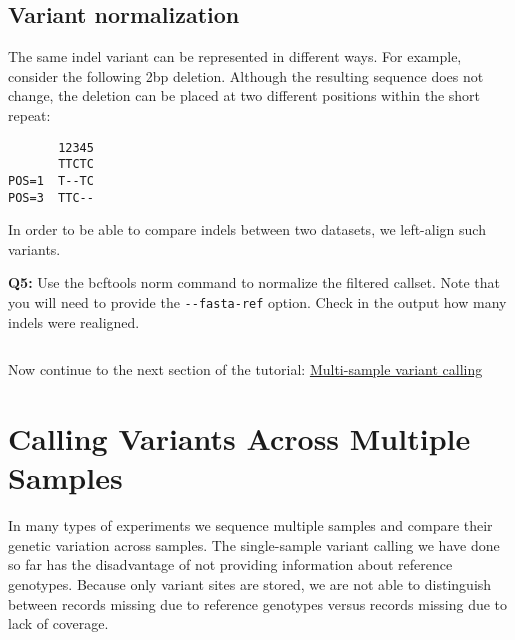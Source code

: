 \documentclass[11pt]{article}
\makeatletter
\newcommand{\boxspacing}{\kern\kvtcb@left@rule\kern\kvtcb@boxsep}
\newcommand{\prompt}[4]{

        {\ttfamily\llap{{\color{blue}\LARGE\faKeyboardO\hspace{3pt}#4}}\vspace{-\baselineskip}}
    }
\makeatother
\begin{document}
    \hypertarget{variant-normalization}{%
\subsection{Variant normalization}\label{variant-normalization}}

The same indel variant can be represented in different ways. For
example, consider the following 2bp deletion. Although the resulting
sequence does not change, the deletion can be placed at two different
positions within the short repeat:

\begin{verbatim}
       12345
       TTCTC
POS=1  T--TC
POS=3  TTC--
\end{verbatim}

In order to be able to compare indels between two datasets, we
left-align such variants.

\textbf{Q5:} Use the bcftools norm command to normalize the filtered
callset. Note that you will need to provide the \texttt{-\/-fasta-ref}
option. Check in the output how many indels were realigned.

    \begin{tcolorbox}[breakable, size=fbox, boxrule=1pt, pad at break*=1mm,colback=cellbackground, colframe=cellborder]
\prompt{In}{incolor}{ }{\boxspacing}
\begin{Verbatim}[commandchars=\\\{\}]

\end{Verbatim}
\end{tcolorbox}

    Now continue to the next section of the tutorial:
\href{multi-sample-calling.ipynb}{Multi-sample variant calling}





\newpage





    \hypertarget{calling-variants-across-multiple-samples}{%
\section{Calling Variants Across Multiple
Samples}\label{calling-variants-across-multiple-samples}}

In many types of experiments we sequence multiple samples and compare
their genetic variation across samples. The single-sample variant
calling we have done so far has the disadvantage of not providing
information about reference genotypes. Because only variant sites are
stored, we are not able to distinguish between records missing due to
reference genotypes versus records missing due to lack of coverage.
\end{document}
